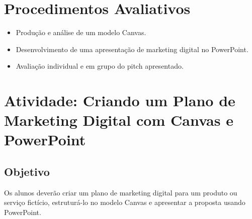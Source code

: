 \documentclass[a4paper,12pt]{article}
\begin{document}
\section*{Procedimentos Avaliativos}
\begin{itemize}
    \item Produção e análise de um modelo Canvas.
    \item Desenvolvimento de uma apresentação de marketing digital no PowerPoint.
    \item Avaliação individual e em grupo do pitch apresentado.
\end{itemize}

\section*{Atividade: Criando um Plano de Marketing Digital com Canvas e PowerPoint}

\subsection*{Objetivo}
Os alunos deverão criar um plano de marketing digital para um produto ou serviço fictício, estruturá-lo no modelo Canvas e apresentar a proposta usando PowerPoint.
\end{document}
